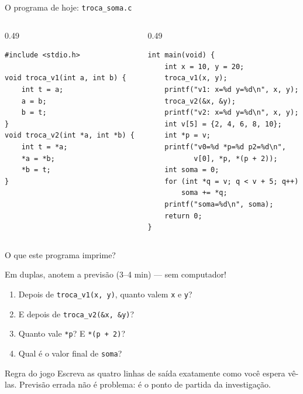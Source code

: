 \documentclass[aspectratio=169]{beamer}
\begin{document}
\begin{frame}[fragile]{O programa de hoje: \texttt{troca\_soma.c}}
\vspace{-2mm}
\begin{columns}[T]
\begin{column}{0.49\textwidth}
\begin{lstlisting}[basicstyle=\ttfamily\scriptsize]
#include <stdio.h>

void troca_v1(int a, int b) {
    int t = a;
    a = b;
    b = t;
}
void troca_v2(int *a, int *b) {
    int t = *a;
    *a = *b;
    *b = t;
}
\end{lstlisting}
\end{column}
\begin{column}{0.49\textwidth}
\begin{lstlisting}[basicstyle=\ttfamily\scriptsize, firstnumber=14]
int main(void) {
    int x = 10, y = 20;
    troca_v1(x, y);
    printf("v1: x=%d y=%d\n", x, y);
    troca_v2(&x, &y);
    printf("v2: x=%d y=%d\n", x, y);
    int v[5] = {2, 4, 6, 8, 10};
    int *p = v;
    printf("v0=%d *p=%d p2=%d\n",
           v[0], *p, *(p + 2));
    int soma = 0;
    for (int *q = v; q < v + 5; q++)
        soma += *q;
    printf("soma=%d\n", soma);
    return 0;
}
\end{lstlisting}
\end{column}
\end{columns}
\end{frame}

\begin{frame}{O que este programa imprime?}
  \begin{block}{Em duplas, anotem a previsão (3--4 min) --- sem computador!}
    \begin{enumerate}
      \item Depois de \texttt{troca\_v1(x, y)}, quanto valem \texttt{x} e \texttt{y}?
      \item E depois de \texttt{troca\_v2(\&x, \&y)}?
      \item Quanto vale \texttt{*p}? E \texttt{*(p + 2)}?
      \item Qual é o valor final de \texttt{soma}?
    \end{enumerate}
  \end{block}
  \begin{exampleblock}{Regra do jogo}
    Escreva as quatro linhas de saída exatamente como você espera vê-las.
    Previsão errada não é problema: é o ponto de partida da investigação.
  \end{exampleblock}
\end{frame}
\end{document}
